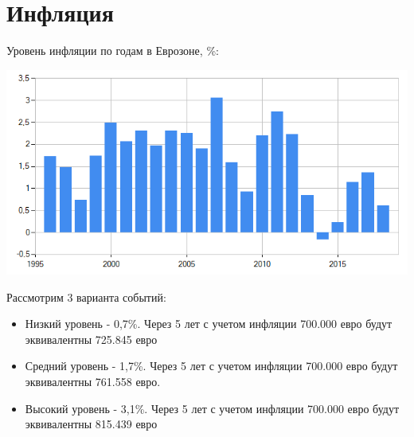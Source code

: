 \section{Инфляция}

Уровень инфляции по годам в Еврозоне, \%:

\includegraphics[width=16cm]{pics/alina/inflation.png}

Рассмотрим 3 варианта событий:

\begin{itemize}
	\item Низкий уровень - 0,7\%. Через 5 лет с учетом инфляции 700.000 евро будут эквивалентны 725.845 евро
	\item Средний уровень - 1,7\%. Через 5 лет с учетом инфляции 700.000 евро будут эквивалентны 761.558 евро.
	\item Высокий уровень - 3,1\%. Через 5 лет с учетом инфляции 700.000 евро будут эквивалентны 815.439 евро
\end{itemize}